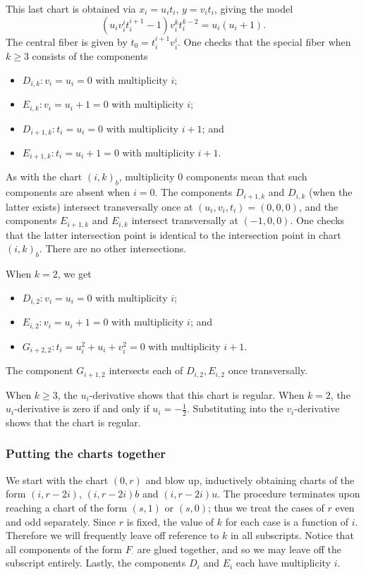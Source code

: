 \documentclass[pagesize,paper=letter]{scrartcl}
\theoremstyle{plain}
\theoremstyle{definition}
\theoremstyle{remark}
\begin{document}
This last chart is obtained via $x_i = u_it_i$, $y = v_it_i$, giving the model
\[
(u_iv_i^it_i^{i+1} - 1) v_i^k t_i^{k-2} = u_i(u_i + 1).
\]
The central fiber is given by $t_0 = t_i^{i+1}v_i^i$. One checks that the special fiber when $k \geq 3$ consists of the components
\begin{itemize}
    \item $D_{i,k}: v_i = u_i = 0$ with multiplicity $i$;
    \item $E_{i,k}: v_i = u_i + 1 = 0$ with multiplicity $i$;
    \item $D_{i+1,k}: t_i = u_i = 0$ with multiplicity $i+1$; and
    \item $E_{i+1,k}: t_i = u_i + 1 = 0$ with multiplicity $i+1$.
\end{itemize}
As with the chart $(i,k)_b$, multiplicity $0$ components mean that such components are absent when $i = 0$.
The components $D_{i+1,k}$ and $D_{i,k}$ (when the latter exists) intersect transversally once at $(u_i, v_i, t_i) = (0,0,0)$, and the components $E_{i+1,k}$ and $E_{i,k}$ intersect transversally at $(-1,0,0)$. One checks that the latter intersection point is identical to the intersection point in chart $(i,k)_b$. There are no other intersections.

When $k = 2$, we get
\begin{itemize}
    \item $D_{i,2}: v_i = u_i = 0$ with multiplicity $i$;
    \item $E_{i,2}: v_i = u_i + 1 = 0$ with multiplicity $i$; and
    \item $G_{i+2,2}: t_i = u_i^2 + u_i + v_i^2 = 0$ with multiplicity $i+1$.
\end{itemize}
The component $G_{i+1,2}$ intersects each of $D_{i,2}, E_{i,2}$ once transversally.

When $k \geq 3$, the $u_i$-derivative shows that this chart is regular. When $k = 2$, the $u_i$-derivative is zero if and only if $u_i = -\frac12$. Substituting into the $v_i$-derivative shows that the chart is regular.


\subsubsection{Putting the charts together}
\label{sec:putt-charts-togeth}

We start with the chart $(0, r)$ and blow up, inductively obtaining charts of the form $(i, r-2i)$, $(i, r-2i)b$ and $(i, r-2i)u$. The procedure terminates upon reaching a chart of the form $(s, 1)$ or $(s, 0)$; thus we treat the cases of $r$ even and odd separately. Since $r$ is fixed, the value of $k$ for each case is a function of $i$. Therefore we will frequently leave off reference to $k$ in all subscripts. Notice that all components of the form $F_{\cdot}$ are glued together, and so we may leave off the subscript entirely. Lastly, the components $D_i$ and $E_i$ each have multiplicity $i$.
\end{document}
